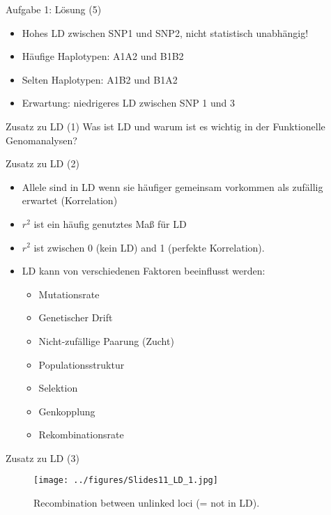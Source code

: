 \documentclass{beamer}
\begin{document}
\begin{frame}{Aufgabe 1: Lösung (5)}
\begin{itemize}
    \item Hohes LD zwischen SNP1 und SNP2, nicht statistisch unabhängig! 
    \item Häufige Haplotypen: A1A2 und B1B2
    \item Selten Haplotypen: A1B2 und B1A2
    \item Erwartung: niedrigeres LD zwischen SNP 1 und 3
\end{itemize}
\end{frame}

\begin{frame}{Zusatz zu LD (1)}
Was ist LD und warum ist es wichtig in der Funktionelle Genomanalysen? 
\end{frame}

\begin{frame}{Zusatz zu LD (2)}
\begin{itemize}
    \item Allele sind in LD wenn sie häufiger gemeinsam vorkommen als zufällig erwartet (Korrelation)
    \item $r^2$ ist ein häufig genutztes Maß für LD 
    \item $r^2$ ist zwischen 0 (kein LD) and 1 (perfekte Korrelation).
    \item LD kann von verschiedenen Faktoren beeinflusst werden: 
    \begin{itemize}
        \item Mutationsrate
        \item Genetischer Drift
        \item Nicht-zufällige Paarung (Zucht)
        \item Populationsstruktur
        \item Selektion
        \item Genkopplung
        \item Rekombinationsrate
    \end{itemize}
\end{itemize}
\end{frame}

\begin{frame}{Zusatz zu LD (3)}
\begin{figure}[h]
\begin{center}
\texttt{[image: ../figures/Slides11\_LD\_1.jpg]}
\caption{Recombination between unlinked loci (= not in LD).}
\label{fig:LD1}
\end{center}
\end{figure}
\end{frame}
\end{document}
